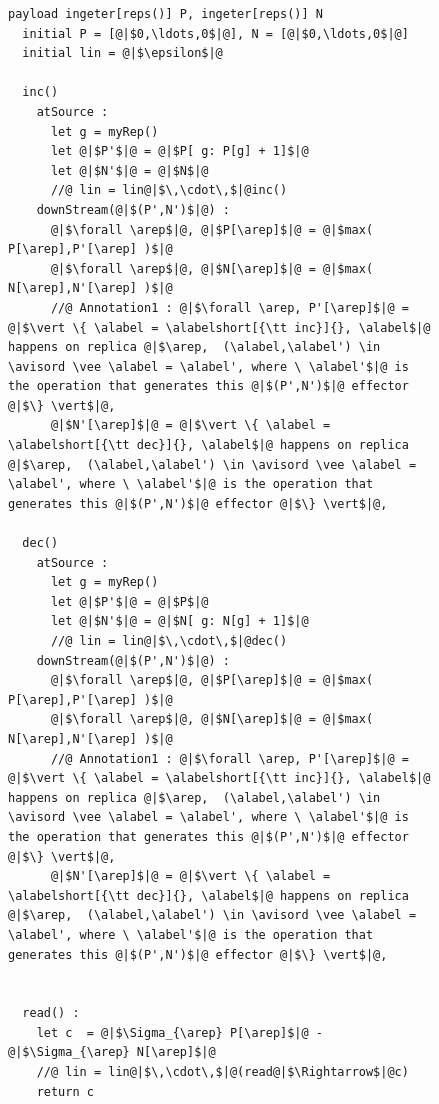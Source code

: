 \begin{figure}[t]
\begin{lstlisting}[frame=top,caption={Pseudo-code of operation-based PN-counter},
captionpos=b,label={lst:operation-based PN-counter}]
  payload ingeter[reps()] P, ingeter[reps()] N
  initial P = [@|$0,\ldots,0$|@], N = [@|$0,\ldots,0$|@]
  initial lin = @|$\epsilon$|@

  inc()
    atSource :
      let g = myRep()
      let @|$P'$|@ = @|$P[ g: P[g] + 1]$|@
      let @|$N'$|@ = @|$N$|@
      //@ lin = lin@|$\,\cdot\,$|@inc()
    downStream(@|$(P',N')$|@) :
      @|$\forall \arep$|@, @|$P[\arep]$|@ = @|$max( P[\arep],P'[\arep] )$|@
      @|$\forall \arep$|@, @|$N[\arep]$|@ = @|$max( N[\arep],N'[\arep] )$|@
      //@ Annotation1 : @|$\forall \arep, P'[\arep]$|@ = @|$\vert \{ \alabel = \alabelshort[{\tt inc}]{}, \alabel$|@ happens on replica @|$\arep,  (\alabel,\alabel') \in \avisord \vee \alabel = \alabel', where \ \alabel'$|@ is the operation that generates this @|$(P',N')$|@ effector @|$\} \vert$|@,
      @|$N'[\arep]$|@ = @|$\vert \{ \alabel = \alabelshort[{\tt dec}]{}, \alabel$|@ happens on replica @|$\arep,  (\alabel,\alabel') \in \avisord \vee \alabel = \alabel', where \ \alabel'$|@ is the operation that generates this @|$(P',N')$|@ effector @|$\} \vert$|@,

  dec()
    atSource :
      let g = myRep()
      let @|$P'$|@ = @|$P$|@
      let @|$N'$|@ = @|$N[ g: N[g] + 1]$|@
      //@ lin = lin@|$\,\cdot\,$|@dec()
    downStream(@|$(P',N')$|@) :
      @|$\forall \arep$|@, @|$P[\arep]$|@ = @|$max( P[\arep],P'[\arep] )$|@
      @|$\forall \arep$|@, @|$N[\arep]$|@ = @|$max( N[\arep],N'[\arep] )$|@
      //@ Annotation1 : @|$\forall \arep, P'[\arep]$|@ = @|$\vert \{ \alabel = \alabelshort[{\tt inc}]{}, \alabel$|@ happens on replica @|$\arep,  (\alabel,\alabel') \in \avisord \vee \alabel = \alabel', where \ \alabel'$|@ is the operation that generates this @|$(P',N')$|@ effector @|$\} \vert$|@,
      @|$N'[\arep]$|@ = @|$\vert \{ \alabel = \alabelshort[{\tt dec}]{}, \alabel$|@ happens on replica @|$\arep,  (\alabel,\alabel') \in \avisord \vee \alabel = \alabel', where \ \alabel'$|@ is the operation that generates this @|$(P',N')$|@ effector @|$\} \vert$|@,


  read() :
    let c  = @|$\Sigma_{\arep} P[\arep]$|@ - @|$\Sigma_{\arep} N[\arep]$|@
    //@ lin = lin@|$\,\cdot\,$|@(read@|$\Rightarrow$|@c)
    return c
\end{lstlisting}
\end{figure}



